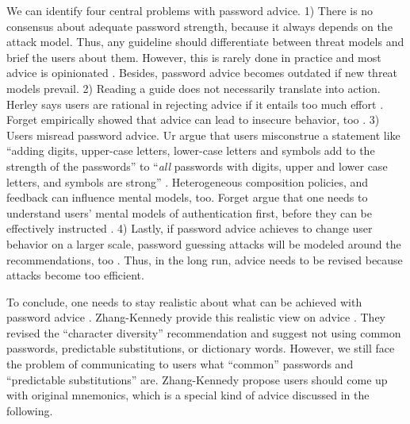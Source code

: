 	We can identify four central problems with password advice. 
	1) There is no consensus about adequate password strength, because it always depends on the attack model. Thus, any guideline should differentiate between threat models and brief the users about them. However, this is rarely done in practice and most advice is opinionated \cite{Herley2015Counterfactuals}. Besides, password advice becomes outdated if new threat models prevail.
	2) Reading a guide does not necessarily translate into action. Herley says users are rational in rejecting advice if it entails too much effort \cite{Herley2009SoLongThanksExternalities}. Forget \etal empirically showed that advice can lead to insecure behavior, too \cite{Forget2007HelpingUsers}. 
	3) Users misread password advice. Ur \etal argue that users misconstrue a statement like ``adding digits, upper-case letters, lower-case letters and symbols add to the strength of the passwords'' to ``\textit{all} passwords with digits, upper and lower case letters, and symbols are strong'' \cite{Ur2016PerceptionsPassword}. Heterogeneous composition policies, and feedback can influence mental models, too.	Forget \etal argue that one needs to understand users' mental models of authentication first, before they can be effectively instructed \cite{Forget2007HelpingUsers}.
	4) Lastly, if password advice achieves to change user behavior on a larger scale, password guessing attacks will be modeled around the recommendations, too \cite{Herley2012PersistenceOfPasswords}. Thus, in the long run, advice needs to be revised because attacks become too efficient.
		
	
	To conclude, one needs to stay realistic about what can be achieved with password advice \cite{Florencio2016CommACM}. Zhang-Kennedy \etal provide this realistic view on advice \cite{ZhangKennedy2016RevisitingPasswordRules}. They revised the ``character diversity'' recommendation and suggest not using common passwords, predictable substitutions, or dictionary words. However, we still face the problem of communicating to users what ``common'' passwords and ``predictable substitutions'' are. Zhang-Kennedy \etal propose users should come up with original mnemonics, which is a special kind of advice discussed in the following. 	
		
